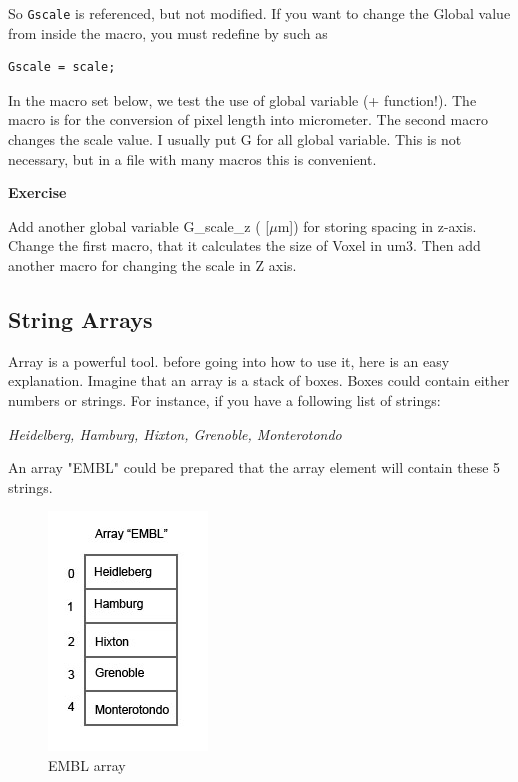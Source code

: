 \documentclass[11pt,a4paper,oneside]{report}
\newenvironment{indentexercise}[1]%
{{\setlength{\leftmargin}{2em}}%
\textbf{Exercise \thesubsection-#1}%
\begin{list}{}%
	\item%
}
{\end{list}}
\newcommand{\ilcom}[1]{\texttt{\small#1}}
\begin{document}
So \ilcom{Gscale} is referenced, but not modified. If you want to change the Global value from inside the macro, you must redefine by such as
\begin{lstlisting}[numbers=none]
Gscale = scale;
\end{lstlisting}
In the macro set below, we test the use of global variable (+ function!). The macro is for the conversion of pixel length into micrometer. The second macro changes the scale value. I usually put G for all global variable. This is not necessary, but in a file with many macros this is convenient.

\begin{indentexercise}{1}
Add another global variable G\_scale\_z ( [\ensuremath{\mu}m]) for storing spacing in z-axis. Change the first macro, that it calculates the size of Voxel in um3. Then add another macro for changing the scale in Z axis. 
\end{indentexercise}

\subsection{String Arrays}
Array is a powerful tool. before going into how to use it, here is an easy explanation. Imagine that an array is a stack of boxes. Boxes could contain either numbers or strings. For instance, if you have a following list of strings:

\textit{Heidelberg, Hamburg, Hixton, Grenoble, Monterotondo}

An array "EMBL" could be prepared that the array element will contain these 5 strings. 

\begin{figure}[htbp]
\begin{center}
\includegraphics[scale=0.6]{fig/fig2441_arrayScheme.jpg}
\caption{EMBL array}
\label{figEMBLarray}
\end{center}
\end{figure} 
 
\end{document}
